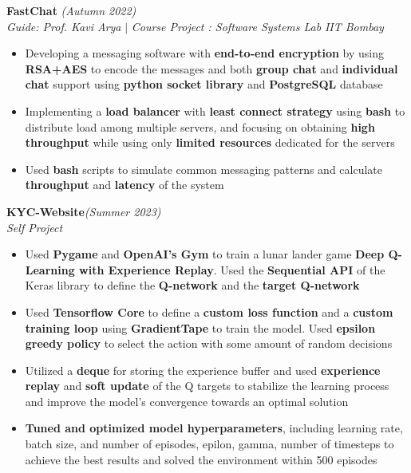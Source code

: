 \documentclass[a4paper,10pt]{article}
\begin{document}
\vspace{\baselineskip}
\vspace{-15pt}
\noindent\textbf{\large FastChat} \hfill{\sl \small (Autumn 2022)}\\
{\it Guide: Prof. Kavi Arya} $|$ {\it Course Project : Software Systems Lab } \hfill{\it IIT Bombay}\\
\vspace{-15pt}
\begin{itemize}[itemsep = -0.65 mm, leftmargin=*]
    \item Developing a messaging software with \textbf{end-to-end encryption} by using \textbf{RSA+AES} to encode the messages and both \textbf{group chat} and \textbf{individual chat} support using \textbf{python socket library} and \textbf{PostgreSQL} database
    \item Implementing a \textbf{load balancer} with \textbf{least connect strategy} using \textbf{bash} to distribute load among multiple servers, and focusing on obtaining \textbf{high throughput} while using only \textbf{limited resources} dedicated for the servers
    \item Used \textbf{bash} scripts to simulate common messaging patterns and calculate \textbf{throughput} and \textbf{latency} of the system
\end{itemize}
\vspace{\baselineskip}
\vspace{-15pt}
\noindent\textbf{\large KYC-Website}\hfill{\sl \small (Summer 2023)}\\
{\it Self Project}
\\\vspace{-15pt}
\begin{itemize}[itemsep = -0.65 mm, leftmargin=*]
    \item Used \textbf{Pygame} and \textbf{OpenAI's Gym} to train a lunar lander game \textbf{Deep Q-Learning with Experience Replay}. Used the \textbf{Sequential API} of the Keras library to define the \textbf{Q-network} and the \textbf{target Q-network}
    \item Used \textbf{Tensorflow Core} to define a \textbf{custom loss function} and a \textbf{custom training loop} using \textbf{GradientTape} to train the model. Used \textbf{epsilon greedy policy} to select the action with some amount of random decisions
    \item Utilized a \textbf{deque} for storing the experience buffer and used \textbf{experience replay} and \textbf{soft update} of the Q targets to stabilize the learning process and improve the model's convergence towards an optimal solution
    \item \textbf{Tuned and optimized model hyperparameters}, including learning rate, batch size, and number of episodes, epilon, gamma, number of timesteps to achieve the best results and solved the environment within 500 episodes
\end{itemize}
\end{document}
